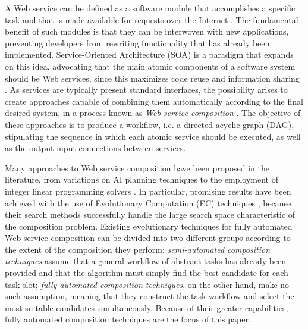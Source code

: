\documentclass{article}
\begin{document}
A Web service can be defined as a software module that accomplishes a specific task and that is made available for requests over
the Internet \cite{gottschalk2002introduction}. The fundamental benefit of such modules is that they can be interwoven with new applications, preventing developers from rewriting
functionality that has already been implemented. Service-Oriented Architecture (SOA) is a paradigm that expands on this idea, advocating
that the main atomic components of a software system should be Web services, since this maximizes code reuse and information sharing \cite{perrey2003service}.
As services are typically present standard interfaces, the possibility arises to create approaches capable of combining them
automatically according to the final desired system, in a process known as \textit{Web service composition} \cite{milanovic2004current}. The objective of these approaches
is to produce a workflow, i.e. a directed acyclic graph (DAG), stipulating the sequence in which each atomic service should be executed, as well as
the output-input connections between services.

Many approaches to Web service composition have been proposed in the literature, from variations on AI planning techniques \cite{deng2013efficient} to the employment
of integer linear programming solvers \cite{yoo2008web}. In particular, promising results have been achieved with the use of Evolutionary Computation (EC) techniques \cite{wang2012survey},
because their search methods successfully handle the large search space characteristic of the composition problem. Existing evolutionary
techniques for fully automated Web service composition can be divided into two different groups according to the extent of the composition they
perform: \textit{semi-automated composition techniques} assume that a general workflow of abstract tasks has already been provided and that the
algorithm must simply find the best candidate for each task slot; \textit{fully automated composition techniques}, on the other hand, make no such
assumption, meaning that they construct the task workflow and select the most suitable candidates simultaneously. Because of their greater capabilities,
fully automated composition techniques are the focus of this paper.
\end{document}
